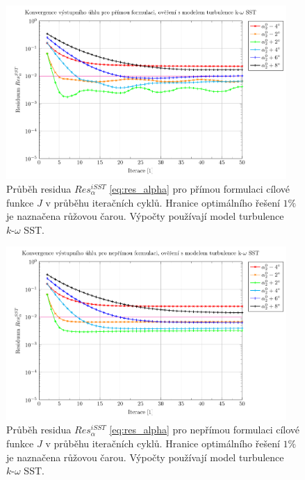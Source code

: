 \begin{figure}[H]
	\centering
	\includegraphics[width=0.95\textwidth]{img/UyAKO.pdf}
	\caption[ Průběh residua $ Res_{\alpha}^{iSST} $, přímá formulace, $k\text{-}\omega$ SST ]{Průběh residua $ Res_{\alpha}^{iSST} $ \ref{eq:res_alpha} pro přímou formulaci cílové funkce $ J $ v průběhu iteračních cyklů. Hranice optimálního řešení $ 1\% $ je naznačena růžovou čarou. Výpočty používají model turbulence $k\text{-}\omega$ SST.}
	\label{fig:ghs1_UyAKO}
\end{figure}
\begin{figure}[H]
	\centering
	\includegraphics[width=0.95\textwidth]{img/FyAKO.pdf}
	\caption[ Průběh residua $ Res_{\alpha}^{iSST} $, nepřímá formulace, $k\text{-}\omega$ SST ]{Průběh residua $ Res_{\alpha}^{iSST} $ \ref{eq:res_alpha} pro nepřímou formulaci cílové funkce $ J $ v průběhu iteračních cyklů. Hranice optimálního řešení $ 1\% $ je naznačena růžovou čarou. Výpočty používají model turbulence $k\text{-}\omega$ SST.}
	\label{fig:ghs1_FyAKO}
\end{figure}
